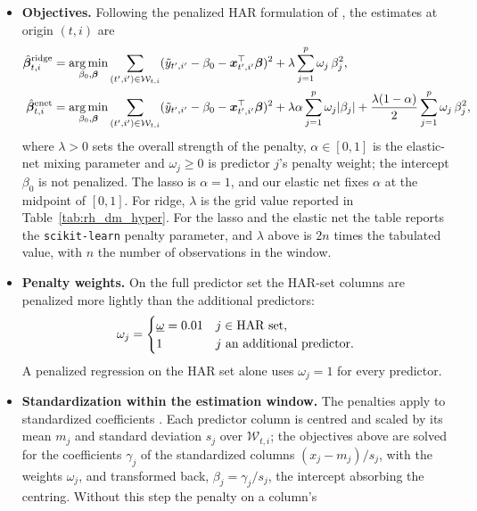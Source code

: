 \begin{itemize}
\item \textbf{Objectives.} Following the penalized HAR formulation of \citet{ZhangZhangCucuringuQian2024}, the
  estimates at origin $(t,i)$ are
  \begin{align*}
    \hat{\bm\beta}^{\mathrm{ridge}}_{t,i} &= \operatorname*{arg\,min}_{\beta_0, \bm\beta} \sum_{(t',i') \in \mathcal W_{t,i}}
      (\tilde y_{t',i'} - \beta_0 - \bm x_{t',i'}^\top \bm\beta)^2 + \lambda \sum_{j=1}^{p} \omega_j\, \beta_j^2, \\
    \hat{\bm\beta}^{\mathrm{enet}}_{t,i} &= \operatorname*{arg\,min}_{\beta_0, \bm\beta} \sum_{(t',i') \in \mathcal W_{t,i}}
      (\tilde y_{t',i'} - \beta_0 - \bm x_{t',i'}^\top \bm\beta)^2
      + \lambda\alpha \sum_{j=1}^{p} \omega_j |\beta_j|
      + \frac{\lambda(1-\alpha)}{2} \sum_{j=1}^{p} \omega_j\, \beta_j^2 ,
  \end{align*}
  where $\lambda > 0$ sets the overall strength of the penalty, $\alpha \in [0,1]$ is the elastic-net mixing
  parameter and $\omega_j \ge 0$ is predictor $j$'s penalty weight; the intercept $\beta_0$ is not penalized. The lasso
  is $\alpha = 1$, and our elastic net fixes $\alpha$ at the midpoint of $[0,1]$. For ridge, $\lambda$ is the grid
  value reported in Table~\ref{tab:rh_dm_hyper}. For the lasso and the elastic net the table reports the
  \texttt{scikit-learn} penalty parameter, and $\lambda$ above is $2n$ times the tabulated value, with $n$ the number
  of observations in the window.
\item \textbf{Penalty weights.} On the full predictor set the HAR-set columns are penalized more lightly than the
  additional predictors:
  \[
    \omega_j =
    \begin{cases}
      \underline\omega = 0.01 & j \in \text{HAR set}, \\
      1 & j \text{ an additional predictor}.
    \end{cases}
  \]
  A penalized regression on the HAR set alone uses $\omega_j = 1$ for every predictor.
\item \textbf{Standardization within the estimation window.} The penalties apply to standardized coefficients
  \citep{Tibshirani1996, FriedmanHastieTibshirani2010}. Each predictor column is centred and scaled by its mean $m_j$
  and standard deviation $s_j$ over $\mathcal W_{t,i}$; the objectives above are solved for the coefficients
  $\gamma_j$ of the standardized columns $(x_j - m_j)/s_j$, with the weights $\omega_j$, and transformed back,
  $\beta_j = \gamma_j / s_j$, the intercept absorbing the centring. Without this step the penalty on a column's

\end{itemize}
